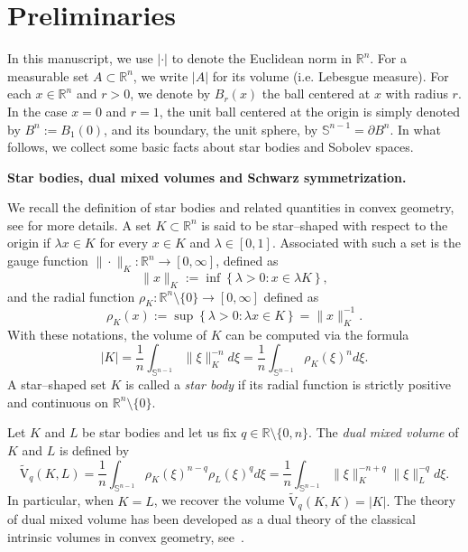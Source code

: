 \documentclass[11pt, reqno]{article}
\theoremstyle{definition}
\numberwithin{equation}{section}
\newcommand{\R}{\mathbb{R}}
\newcommand{\Sphere}{\mathbb{S}^{n - 1}}
\newcommand{\vtil}{\widetilde{\mathrm{V}}}
\begin{document}
\section{Preliminaries}\label{sec:prelim}

In this manuscript, we use $| \cdot |$ to denote the Euclidean norm in $\R^n$. For a measurable set $A \subset \R^n$, we write $|A|$ for its volume (i.e. Lebesgue measure). 
For each $x \in \R^n$ and $r > 0$, we denote by  $B_r(x)$ the ball centered at $x$ with radius $r$.
In the case $x = 0$ and $r = 1$, the unit ball centered at the origin is simply denoted by $B^n := B_1(0)$, and its boundary, the unit sphere, by $\Sphere = \partial B^n$.
In what follows, we collect some basic facts about star bodies and Sobolev spaces.

\medskip

\textbf{Star bodies, dual mixed volumes and Schwarz symmetrization.}

\medskip

We recall the definition of star bodies and related quantities in convex geometry, see \cite{S_2014} for more details.
A set $K \subset \R^n$ is said to be star--shaped with respect to the origin if $\lambda x \in K$ for every $x \in K$ and $\lambda \in [0, 1]$.
Associated with such a set is the gauge function $\| \cdot \|_K : \R^n \to [0, \infty]$, defined as
	\[
		\| x \|_K := \inf \left\{ \lambda > 0: x \in \lambda K  \right\},
	\]
and the radial function $\rho_K : \R^n \setminus \{ 0 \} \to [0, \infty]$ defined as
	\[
		\rho_K(x) := \sup \left\{  \lambda > 0: \lambda x \in K \right\} = \| x \|_K^{-1}.
	\]
With these notations, the volume of $K$ can be computed via the formula
	\begin{equation}\label{gauge-volume}
		| K | = \dfrac{1}{n} \int_{\Sphere} \| \xi \|_K^{-n} d\xi = \dfrac{1}{n} \int_{\Sphere} \rho_K(\xi)^n d\xi.	
	\end{equation}
A star--shaped set $K$ is called a \textit{star body} if its radial function is strictly positive and continuous on $\R^n \setminus \{ 0 \}$.

\medskip

Let $K$ and $L$ be star bodies and let us fix $q \in \R \setminus \{ 0, n \}$.
The \textit{dual mixed volume} of $K$ and $L$ is defined by
	\begin{equation}\label{vtil}
		\vtil_q(K, L) = \dfrac{1}{n} \int_{\Sphere} \rho_K(\xi)^{n - q} \rho_L(\xi)^q d\xi = \dfrac{1}{n} \int_{\Sphere} \| \xi \|_K^{-n + q} \| \xi \|_L^{-q} d\xi.
	\end{equation}
In particular, when $K = L$, we recover the volume $\vtil_q(K, K) = |K|.$
The theory of dual mixed volume has been developed as a dual theory of the classical intrinsic volumes in convex geometry, see~\cite{Lutwak_75, Lutwak_79, Lutwak_88}.
\end{document}
